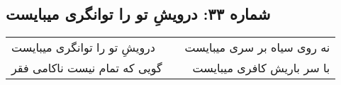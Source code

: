 \begin{center}
\section*{شماره ۳۳: درویشِ تو را توانگری میبایست}
\label{sec:033}
\begin{longtable}{l p{0.5cm} r}
درویشِ تو را توانگری میبایست
&&
نه روی سیاه بر سری میبایست
\\
گویی که تمام نیست ناکامی فقر
&&
با سر باریش کافری میبایست
\\
\end{longtable}
\end{center}
